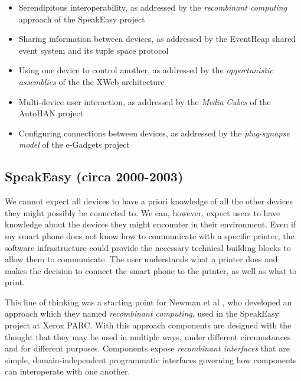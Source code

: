 \begin{itemize}
	\item Serendipitous interoperability, as addressed by the \emph{recombinant computing} approach of the SpeakEasy project
	\item Sharing information between devices, as addressed by the Event\-Heap shared event system and its tuple space protocol
	\item Using one device to control another, as addressed by the \emph{opportunistic assemblies} of the the XWeb architecture
	\item Multi-device user interaction, as addressed by the \emph{Media Cubes} of the AutoHAN project
	\item Configuring connections between devices, as addressed by the \emph{plug-synapse model} of the e-Gadgets project
\end{itemize}



\subsection{SpeakEasy (circa 2000-2003)}

We cannot expect all devices to have a priori knowledge of all the other devices they might possibly be connected to. We can, however, expect users to have knowledge about the devices they might encounter in their environment. Even if my smart phone does not know how to communicate with a specific printer, the software infrastructure could provide the necessary technical building blocks to allow them to communicate. The user understands what a printer does and makes the decision to connect the smart phone to the printer, as well as what to print.


This line of thinking was a starting point for Newman et al \cite{Newman2002}, who developed an approach which they named \emph{recombinant computing}, used in the SpeakEasy project at Xerox PARC. With this approach components are designed with the thought that they may be used in multiple ways, under different circumstances and for different purposes. Components expose \emph{recombinant interfaces} that are simple, domain-independent programmatic interfaces governing how components can interoperate with one another.

